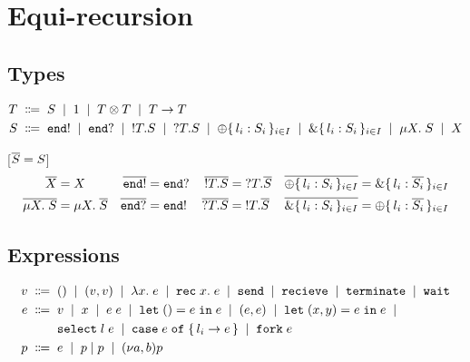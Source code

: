 \section{Equi-recursion}

\subsection{Types}

\begin{align*}
  T \grmdef&
    S               \grmor
    \TUnit          \grmor
    \TPair T T      \grmor
    \TFun  T T      \\
  S \grmdef&
    \TEnd !         \grmor
    \TEnd ?         \grmor
    \TOut T S       \grmor
    \TIn  T S       \grmor
    \TSelect{ l_i: S_i } \grmor
    \TCase{ l_i: S_i }   \grmor
    \TRec[X] S      \grmor
    X
\end{align*}

[$\TDual S = S$]
\begin{align*}
  \TDual X &= X                               &
  \TDual{\TEnd !} &= \TEnd ?                  &
  \TDual{\TOut T S} &= \TIn T \TDual{S}       &
  \TDual{\TSelect{ l_i: S_i }} &=
    \TCase{ l_i: \TDual{S_i} }                \\
  \TDual{\TRec S} &= \TRec{\TDual S}          &
  \TDual{\TEnd ?} &= \TEnd !                  &
  \TDual{\TIn T S} &= \TOut T \TDual{S}       &
  \TDual{\TCase{ l_i: S_i }} &=
    \TSelect{ l_i: \TDual{S_i} }
\end{align*}




\subsection{Expressions}

\begin{align*}
  v \grmdef&
    \EUnit                   \grmor
    (v, v)                   \grmor
    \ELam x e                \grmor
    \ERec x e                \grmor
    \EkwSend \grmor \EkwRecv \grmor
    \EkwTerm \grmor \EkwWait
  \\
  e \grmdef&
    v                       \grmor
    x                       \grmor
    e \; e                  \grmor
    \ELetU e e              \grmor
    (e, e)                  \grmor
    \ELetP x y e e          \grmor
  \\ &
    \ESelect l e            \grmor
    \ECase e { l_i \rightarrow e } \grmor
    \EFork e
  \\
  p \grmdef&
    e                       \grmor
    \PPar p p               \grmor
    \PScope p
\end{align*}


